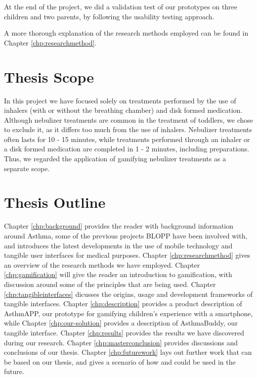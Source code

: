 At the end of the project, we did a validation test of our prototypes on three children and two parents, by following the usability testing approach. 

A more thorough explanation of the research methods employed can be found in Chapter \ref{chp:researchmethod}. 


\section{Thesis Scope}
\label{sec:thesis scope}

In this project we have focused solely on treatments performed by the use of inhalers (with or without the breathing chamber) and disk formed medication. Although nebulizer treatments are common in the treatment of toddlers, we chose to exclude it, as it differs too much from the use of inhalers. Nebulizer treatments often lasts for 10 - 15 minutes, while treatments performed through an inhaler or a disk formed medication are completed in 1 - 2 minutes, including preparations. Thus, we regarded the application of gamifying nebulizer treatments as a separate scope.
 


\section{Thesis Outline}
\label{sec:thesisoutline}
Chapter \ref{chp:background} provides the reader with background information around Asthma, some of the previous projects BLOPP have been involved with, and introduces the latest developments in the use of mobile technology and tangible user interfaces for medical purposes.
Chapter \ref{chp:researchmethod} gives an overview of the research methods we have employed.  
Chapter \ref{chp:gamification} will give the reader an introduction to gamification, with discussion around some of the principles that are being used. 
Chapter \ref{chp:tangibleinterfaces} dicusses the origins, usage and development frameworks of tangible interfaces.
Chapter \ref{chp:description} provides a product description of AsthmAPP, our prototype for gamifying children's experience with a smartphone, while Chapter \ref{chp:our-solution} provides a description of AsthmaBuddy, our tangible interface.
Chapter \ref{chp:results} provides the results we have discovered during our research.
Chapter \ref{chp:masterconclusion} provides discussions and conclusions of our thesis.
Chapter \ref{chp:futurework} lays out further work that can be based on our thesis, and gives a scenario of how \ab{} and \app{} could be used in the future.            
